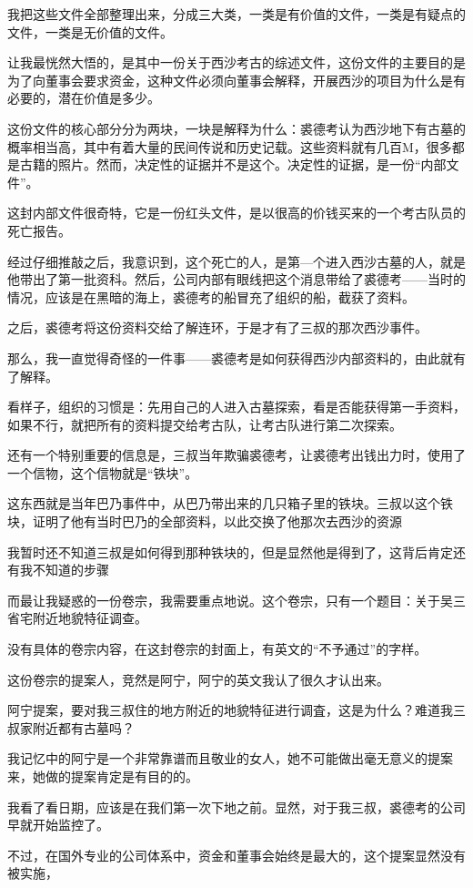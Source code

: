 我把这些文件全部整理出来，分成三大类，一类是有价值的文件，一类是有疑点的文件，一类是无价值的文件。

让我最恍然大悟的，是其中一份关于西沙考古的综述文件，这份文件的主要目的是为了向董事会要求资金，这种文件必须向董事会解释，开展西沙的项目为什么是有必要的，潜在价值是多少。

这份文件的核心部分分为两块，一块是解释为什么：裘德考认为西沙地下有古墓的概率相当高，其中有着大量的民间传说和历史记载。这些资料就有几百M，很多都是古籍的照片。然而，决定性的证据并不是这个。决定性的证据，是一份“内部文件”。

这封内部文件很奇特，它是一份红头文件，是以很高的价钱买来的一个考古队员的死亡报告。

经过仔细推敲之后，我意识到，这个死亡的人，是第—个进入西沙古墓的人，就是他带出了第一批资科。然后，公司内部有眼线把这个消息带给了裘德考——当时的情况，应该是在黑暗的海上，裘德考的船冒充了组织的船，截获了资料。

之后，裘德考将这份资料交给了解连环，于是才有了三叔的那次西沙事件。

那么，我一直觉得奇怪的一件事——裘德考是如何获得西沙内部资料的，由此就有了解释。

看样子，组织的习惯是：先用自己的人进入古墓探索，看是否能获得第一手资料，如果不行，就把所有的资料提交给考古队，让考古队进行第二次探索。

还有一个特别重要的信息是，三叔当年欺骗裘德考，让裘德考出钱出力时，使用了一个信物，这个信物就是“铁块”。

这东西就是当年巴乃事件中，从巴乃带出来的几只箱子里的铁块。三叔以这个铁块，证明了他有当时巴乃的全部资料，以此交换了他那次去西沙的资源

我暂时还不知道三叔是如何得到那种铁块的，但是显然他是得到了，这背后肯定还有我不知道的步骤

而最让我疑惑的一份卷宗，我需要重点地说。这个卷宗，只有一个题目：关于吴三省宅附近地貌特征调查。

没有具体的卷宗内容，在这封卷宗的封面上，有英文的“不予通过”的字样。

这份卷宗的提案人，竞然是阿宁，阿宁的英文我认了很久才认出来。

阿宁提案，要对我三叔住的地方附近的地貌特征进行调査，这是为什么？难道我三叔家附近都有古墓吗？

我记忆中的阿宁是一个非常靠谱而且敬业的女人，她不可能做出毫无意义的提案来，她做的提案肯定是有目的的。

我看了看日期，应该是在我们第一次下地之前。显然，对于我三叔，裘德考的公司早就开始监控了。

不过，在国外专业的公司体系中，资金和董事会始终是最大的，这个提案显然没有被实施，

